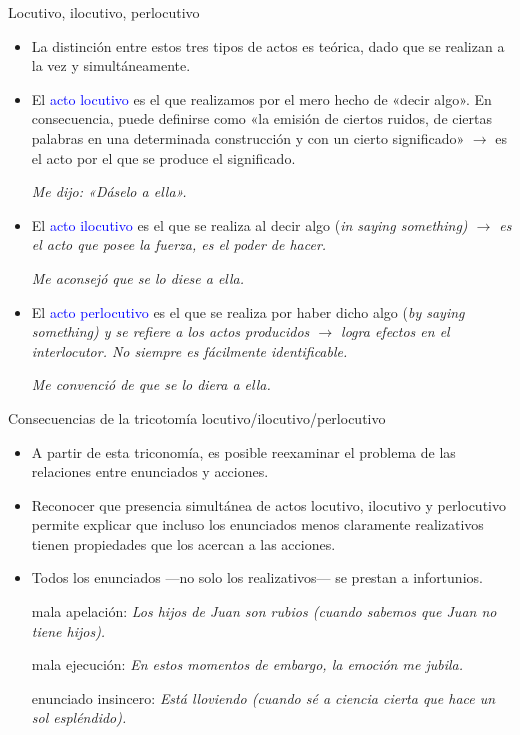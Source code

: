 \documentclass{beamer}
\begin{document}
\begin{frame}{Locutivo, ilocutivo, perlocutivo}

\begin{itemize}
	\item La distinción entre estos tres tipos de actos es teórica, dado que se realizan a la vez y simultáneamente.

	\item El \textcolor{blue}{acto locutivo} es el que realizamos por el mero hecho de «decir algo». En consecuencia, puede definirse como «la emisión de ciertos ruidos, de ciertas palabras en una determinada construcción y con un cierto significado» $\rightarrow$ es el acto por el que se produce el significado.
	
	\it{Me dijo: «Dáselo a ella».}
	
	\item El \textcolor{blue}{acto ilocutivo} es el que se realiza al decir algo (\it{in saying something}) $\rightarrow$ es el acto que posee la fuerza, es el poder de hacer. 

	\it{Me aconsejó que se lo diese a ella.}

	\item El \textcolor{blue}{acto perlocutivo} es el que se realiza por haber dicho algo (\it{by saying something}) y se refiere a los actos producidos $\rightarrow$ logra efectos en el interlocutor. No siempre es fácilmente identificable.

	\it{Me convenció de que se lo diera a ella.}
\end{itemize}

\end{frame}

\begin{frame}{Consecuencias de la tricotomía locutivo/ilocutivo/perlocutivo}

	\begin{itemize}
		\item A partir de esta triconomía, es posible reexaminar el problema de las relaciones entre enunciados y acciones. 
		\item Reconocer que presencia simultánea de actos locutivo, ilocutivo y perlocutivo permite explicar que incluso los enunciados menos claramente realizativos tienen propiedades que los acercan a las acciones. 
		\item Todos los enunciados ---no solo los realizativos--- se prestan a infortunios.
		
		mala apelación: \it{Los hijos de Juan son rubios} (cuando sabemos que Juan no tiene hijos).

		mala ejecución: \it{En estos momentos de embargo, la emoción me jubila}.

		enunciado insincero: \it{Está lloviendo} (cuando sé a ciencia cierta que hace un sol espléndido).
	\end{itemize}

\end{frame}
\end{document}
